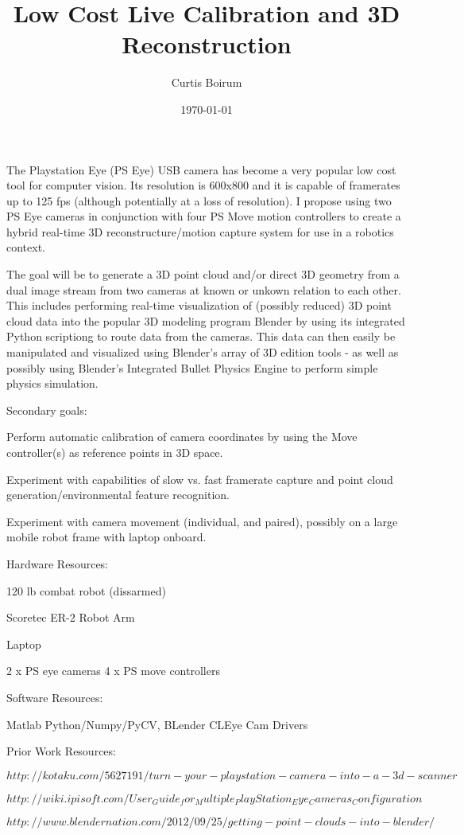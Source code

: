 \documentclass[12pt]{article}
\author{Curtis Boirum}
\title{Low Cost Live Calibration and 3D Reconstruction}
\date{\today}
\begin{document}
\maketitle

The Playstation Eye (PS Eye) USB camera has become a very popular low cost tool for computer vision. Its resolution is 600x800 and it is capable of framerates up to 125 fps (although potentially at a loss of resolution). I propose using two PS Eye cameras in conjunction with four PS Move motion controllers to create a hybrid real-time 3D reconstructure/motion capture system for use in a robotics context. 

The goal will be to generate a 3D point cloud and/or direct 3D geometry from a dual image stream from two cameras at known or unkown relation to each other. This includes performing real-time visualization of (possibly reduced) 3D point cloud data into the popular 3D modeling program Blender by using its integrated Python scriptiong to route data from the cameras. This data can then easily be manipulated and visualized using Blender's array of 3D edition tools - as well as possibly using Blender's Integrated Bullet Physics Engine to perform simple physics simulation.

Secondary goals:

Perform automatic calibration of camera coordinates by using the Move controller(s) as reference points in 3D space.

Experiment with capabilities of slow vs. fast framerate capture and point cloud generation/environmental feature recognition.

Experiment with camera movement (individual, and paired), possibly on a large mobile robot frame with laptop onboard.

Hardware Resources:

120 lb combat robot (dissarmed)

Scoretec ER-2 Robot Arm

Laptop

2 x PS eye cameras
4 x PS move controllers

Software Resources:

Matlab
Python/Numpy/PyCV, 
BLender
CLEye Cam Drivers

Prior Work Resources:

$http://kotaku.com/5627191/turn-your-playstation-camera-into-a-3d-scanner$

$http://wiki.ipisoft.com/User_Guide_for_Multiple_PlayStation_Eye_Cameras_Configuration$

$http://www.blendernation.com/2012/09/25/getting-point-clouds-into-blender/$
\end{document}

